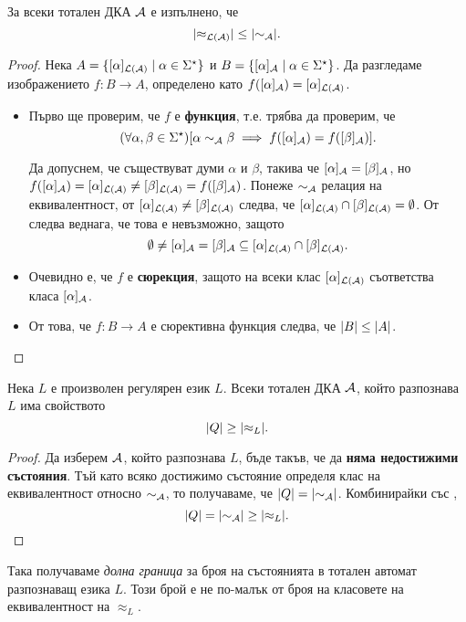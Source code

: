 \begin{cor}
  \label{cor:approx-less-sim}
  За всеки тотален ДКА $\mathcal{A}$ е изпълнено, че
  \[\lvert{\approx_{\mathcal{L}(\mathcal{A})}}\rvert \leq \lvert{\sim_{\mathcal{A}}}\rvert.\]
\end{cor}
\begin{proof}
  Нека $A = \{[\alpha]_{\mathcal{L}(\mathcal{A})} \mid \alpha\in\Sigma^\star\}$ и $B = \{[\alpha]_{\mathcal{A}} \mid \alpha\in\Sigma^\star\}$.
  Да разгледаме изображението $f:B\to A$, определено като $f([\alpha]_{\mathcal{A}}) = [\alpha]_{\mathcal{L}(\mathcal{A})}$.
  \begin{itemize}
  \item 
    Първо ще проверим, че $f$ е {\bf функция}, т.е. трябва да проверим, че 
    \[(\forall\alpha,\beta\in\Sigma^\star)[\alpha \sim_{\mathcal{A}} \beta \implies f([\alpha]_{\mathcal{A}}) = f([\beta]_{\mathcal{A}})].\]
    
    Да допуснем, че съществуват думи $\alpha$ и $\beta$, такива че
    $[\alpha]_{\mathcal{A}} = [\beta]_{\mathcal{A}}$, но $f([\alpha]_{\mathcal{A}}) = [\alpha]_{\mathcal{L}(\mathcal{A})} \neq [\beta]_{\mathcal{L}(\mathcal{A})} = f([\beta]_{\mathcal{A}})$.
    Понеже $\sim_{\mathcal{A}}$ релация на еквивалентност, от $[\alpha]_{\mathcal{L}(\mathcal{A})} \neq [\beta]_{\mathcal{L}(\mathcal{A})}$
    следва, че $[\alpha]_{\mathcal{L}(\mathcal{A})} \cap [\beta]_{\mathcal{L}(\mathcal{A})} = \emptyset$.
    От  следва веднага, че това е невъзможно, защото
    \[\emptyset \neq [\alpha]_{\mathcal{A}} = [\beta]_{\mathcal{A}} \subseteq [\alpha]_{\mathcal{L}(\mathcal{A})} \cap [\beta]_{\mathcal{L}(\mathcal{A})}.\]
  \item
    Очевидно е, че $f$ е {\bf сюрекция}, защото на всеки клас $[\alpha]_{\mathcal{L}(\mathcal{A})}$ съответства класа $[\alpha]_{\mathcal{A}}$.
  \item
    От това, че $f:B\to A$ е сюрективна функция следва, че $\lvert{B}\rvert \leq \lvert{A}\rvert$.
  \end{itemize}
\end{proof}

\begin{cor}
  \label{cor:upper-bound}
  Нека $L$ е произволен регулярен език $L$.  
  Всеки тотален ДКА $\mathcal{A}$, който разпознава $L$ има свойството
  \[\lvert{Q}\rvert \geq \lvert{\approx_L}\rvert.\]
\end{cor}
\begin{proof}
  Да изберем $\mathcal{A}$, който разпознава $L$, бъде такъв, че да {\bf няма недостижими състояния}.
  Тъй като всяко достижимо състояние определя клас на еквивалентност относно $\sim_{\mathcal{A}}$,
  то получаваме, че $\lvert{Q}\rvert = \lvert{\sim_{\mathcal{A}}}\rvert$.
  Комбинирайки със ,
  \[\lvert{Q}\rvert = \lvert{\sim_{\mathcal{A}}}\rvert \geq \lvert{\approx_L}\rvert.\]
\end{proof}
Така получаваме {\em долна граница} за броя на състоянията в тотален автомат разпознаващ езика $L$.
Този брой е не по-малък от броя на класовете на еквивалентност на $\approx_L$.

